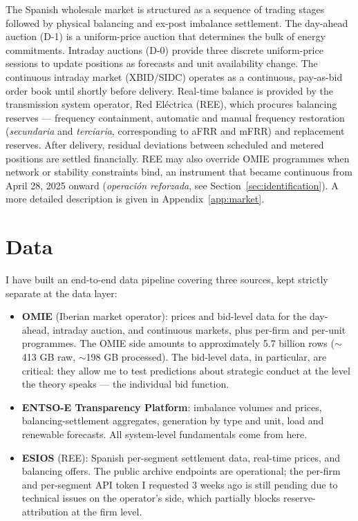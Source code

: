 \documentclass[11pt,a4paper]{article}
\begin{document}
The Spanish wholesale market is structured as a sequence of trading stages followed by physical balancing and ex-post imbalance settlement. The day-ahead auction (D-1) is a uniform-price auction that determines the bulk of energy commitments. Intraday auctions (D-0) provide three discrete uniform-price sessions to update positions as forecasts and unit availability change. The continuous intraday market (XBID/SIDC) operates as a continuous, pay-as-bid order book until shortly before delivery. Real-time balance is provided by the transmission system operator, Red Eléctrica (REE), which procures balancing reserves --- frequency containment, automatic and manual frequency restoration (\emph{secundaria} and \emph{terciaria}, corresponding to aFRR and mFRR) and replacement reserves. After delivery, residual deviations between scheduled and metered positions are settled financially. REE may also override OMIE programmes when network or stability constraints bind, an instrument that became continuous from April 28, 2025 onward (\emph{operación reforzada}, see Section~\ref{sec:identification}). A more detailed description is given in Appendix~\ref{app:market}.

\section{Data}

I have built an end-to-end data pipeline covering three sources, kept strictly separate at the data layer:

\begin{itemize}
  \item \textbf{OMIE} (Iberian market operator): prices and bid-level data for the day-ahead, intraday auction, and continuous markets, plus per-firm and per-unit programmes. The OMIE side amounts to approximately 5.7 billion rows ($\sim$413 GB raw, $\sim$198 GB processed). The bid-level data, in particular, are critical: they allow me to test predictions about strategic conduct at the level the theory speaks --- the individual bid function.
  \item \textbf{ENTSO-E Transparency Platform}: imbalance volumes and prices, balancing-settlement aggregates, generation by type and unit, load and renewable forecasts. All system-level fundamentals come from here.
  \item \textbf{ESIOS} (REE): Spanish per-segment settlement data, real-time prices, and balancing offers. The public archive endpoints are operational; the per-firm and per-segment API token I requested 3 weeks ago is still pending due to technical issues on the operator's side, which partially blocks reserve-attribution at the firm level.
\end{itemize}
\end{document}

